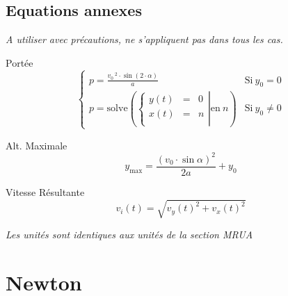 \documentclass[12pt,a4paper]{article} %
\begin{document}
\subsection{Equations annexes}
\emph{A utiliser avec précautions, ne s'appliquent pas dans tous les cas.}
\par\vspace{1em}
\begin{twocols}[0.5][0.4][t]
	Port\'ee
	\begin{equation*}
		\left\{
		\begin{array}{ll}
			p={\displaystyle \frac{v_0\,^2 \cdot \sin (2 \cdot \alpha)}{a}} & \text{Si}\:y_0 = 0 \\
			p=\text{solve}\left(\left\{
					\begin{array}{rcl}
						y(t) & = & 0 \\
						x(t) & = & n \\
					\end{array}
			\right|
				\text{en} \: n
			\right)
			 & \text{Si}\:y_0 \neq 0
		\end{array}
		\right.
	\end{equation*}

\nextcol

	Alt. Maximale
	\begin{equation*}
		y_\text{max} = \frac{(v_0\cdot\sin{\alpha})^2}{2a} + y_0
	\end{equation*}

	Vitesse Résultante
	\begin{equation*}
		v_i(t) = \sqrt{v_y(t)^2 + v_x(t)^2}
	\end{equation*}

\end{twocols}

\vspace{1em}
\emph{Les unités sont identiques aux unités de la section MRUA}

\newpage

\section{Newton}
\end{document}
